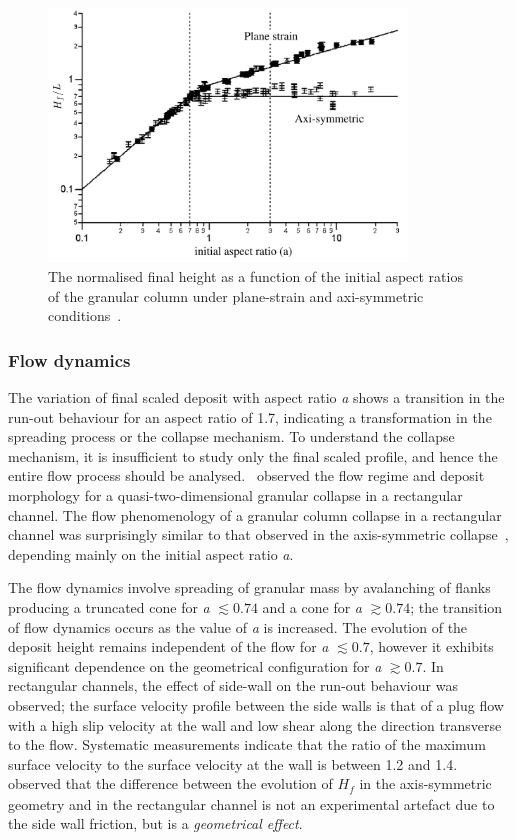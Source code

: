 \begin{figure}[tbhp]
\centering
\includegraphics[width=0.85\textwidth]{Height_Exp}
\caption{The normalised final height as a function of the initial aspect ratios 
of the granular column under plane-strain and axi-symmetric 
conditions~\citep{Lajeunesse2004}.}
\label{fig:Height_Exp}
\end{figure}


\subsubsection{Flow dynamics}
The variation of final scaled deposit with aspect ratio \textit{a} shows a 
transition in the run-out behaviour for an aspect ratio of 1.7, indicating a 
transformation in the spreading process or the collapse mechanism. To 
understand the collapse mechanism, it is insufficient to study only the final 
scaled profile, and hence the entire flow process should be 
analysed.~\citet{Lajeunesse2005} observed the flow regime and deposit 
morphology for a quasi-two-dimensional granular collapse in a rectangular 
channel. The flow phenomenology of a granular column collapse in a rectangular 
channel was surprisingly similar to that observed in the axis-symmetric 
collapse~\citep{Lube2005,Lajeunesse2004}, depending mainly on the initial 
aspect ratio \textit{a}. 

The flow dynamics involve spreading of granular mass 
by avalanching of flanks producing a truncated cone for \textit{a} $\lesssim 
0.74$ and a cone for \textit{a} $\gtrsim 0.74$; the transition of flow dynamics 
occurs as the value of \textit{a} is increased. The evolution of the deposit 
height remains independent of the flow for \textit{a} $\lesssim 0.7$, however 
it exhibits significant dependence on the geometrical configuration for 
\textit{a} $\gtrsim 0.7$. In rectangular channels, the effect of side-wall on 
the run-out behaviour was observed; the surface velocity profile between the 
side walls is that of a plug flow with a high slip velocity at the wall and low 
shear along the direction transverse to the flow. Systematic measurements 
indicate that the ratio of the maximum surface velocity to the surface velocity 
at the wall is between 1.2 and 1.4.~\citet{Lajeunesse2005} observed that the 
difference between the evolution of $\textit{H}_{\textit{f}}$ in the 
axis-symmetric geometry and in the rectangular channel is not an experimental 
artefact due to the side wall friction, but is a \textit{geometrical effect}. 


